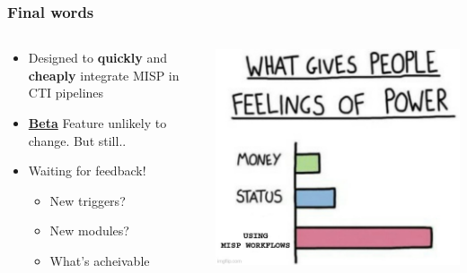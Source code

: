 \begin{frame}
    \frametitle{Final words}
    \begin{columns}
        \begin{column}{0.6\textwidth}
            \begin{itemize}
                \item Designed to \textbf{quickly} and \textbf{cheaply} integrate MISP in CTI pipelines
                \item \underline{\textbf{Beta}} Feature unlikely to change. But still..
                \item Waiting for feedback!
                \begin{itemize}
                    \item New triggers?
                    \item New modules?
                    \item What's acheivable
                \end{itemize}
            \end{itemize}
        \end{column}
        \begin{column}{0.4\textwidth}
            \includegraphics[width=1.0\linewidth]{pictures/feeling-of-power.jpg}
        \end{column}
    \end{columns}
    \vspace*{0.5em}
\end{frame}

